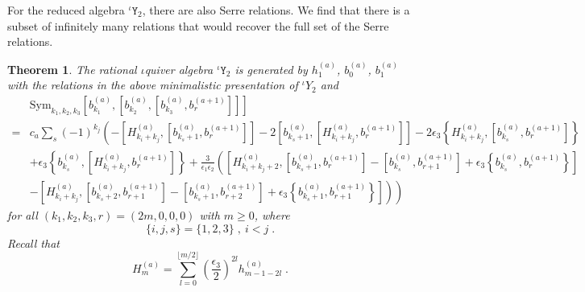 \documentclass[11pt]{article}
\numberwithin{equation}{section}
\numberwithin{figure}{section}
\numberwithin{table}{section}
\newtheorem{theorem}{Theorem}[section]
\begin{document}
For the reduced algebra ${}^\iota\mathtt{Y}_2$, there are also Serre relations. We find that there is a subset of infinitely many relations that would recover the full set of the Serre relations.
\begin{theorem}
	The rational $\iota$quiver algebra ${}^\iota\mathtt{Y}_2$ is generated by $h^{(a)}_1$, $b^{(a)}_0$, $b^{(a)}_1$ with the relations in the above minimalistic presentation of ${}^\iota Y_2$ and
	\begin{align}
		&\mathrm{Sym}_{k_1,k_2,k_3}\left[b^{(a)}_{k_1},\left[b^{(a)}_{k_2},\left[b^{(a)}_{k_3},b^{(a+1)}_r\right]\right]\right]\nonumber\\
		=&c_a\sum_s(-1)^{k_j}\left(-\left[H^{(a)}_{k_i+k_j},\left[b^{(a)}_{k_s+1},b^{(a+1)}_r\right]\right]-2\left[b^{(a)}_{k_s+1},\left[H^{(a)}_{k_i+k_j},b^{(a+1)}_r\right]\right]-2\epsilon_3\left\{H^{(a)}_{k_i+k_j},\left[b^{(a)}_{k_s},b^{(a+1)}_r\right]\right\}\right.\nonumber\\
		&+\epsilon_3\left\{b^{(a)}_{k_s},\left[H^{(a)}_{k_i+k_j},b^{(a+1)}_r\right]\right\}+\frac{3}{\epsilon_1\epsilon_2}\left(\left[H^{(a)}_{k_i+k_j+2},\left[b^{(a)}_{k_s+1},b^{(a+1)}_r\right]-\left[b^{(a)}_{k_s},b^{(a+1)}_{r+1}\right]+\epsilon_3\left\{b^{(a)}_{k_s},b^{(a+1)}_r\right\}\right]\right.\nonumber\\
		&\left.\left.-\left[H^{(a)}_{k_i+k_j},\left[b^{(a)}_{k_s+2},b^{(a+1)}_{r+1}\right]-\left[b^{(a)}_{k_s+1},b^{(a+1)}_{r+2}\right]+\epsilon_3\left\{b^{(a)}_{k_s+1},b^{(a+1)}_{r+1}\right\}\right]\right)\right)
	\end{align}
	for all $(k_1,k_2,k_3,r)=(2m,0,0,0)$ with $m\geq0$, where
	\begin{equation}
		\{i,j,s\}=\{1,2,3\}\;,~i<j\;.
	\end{equation}
	Recall that
	\begin{equation}
		H^{(a)}_m=\sum_{l=0}^{\lfloor m/2\rfloor}\left(\frac{\epsilon_3}{2}\right)^{2l}h^{(a)}_{m-1-2l}\;.
	\end{equation}
\end{theorem}
\end{document}
